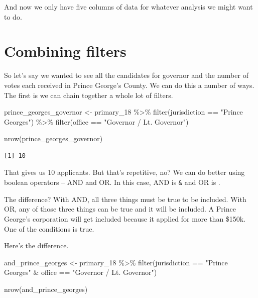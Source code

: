 \documentclass[
  letterpaper,
  DIV=11,
  numbers=noendperiod]{scrreprt}
\newenvironment{Shaded}{\begin{snugshade}}{\end{snugshade}}
\newcommand{\FunctionTok}[1]{\textcolor[rgb]{0.28,0.35,0.67}{#1}}
\newcommand{\NormalTok}[1]{\textcolor[rgb]{0.00,0.23,0.31}{#1}}
\newcommand{\OtherTok}[1]{\textcolor[rgb]{0.00,0.23,0.31}{#1}}
\newcommand{\SpecialCharTok}[1]{\textcolor[rgb]{0.37,0.37,0.37}{#1}}
\newcommand{\StringTok}[1]{\textcolor[rgb]{0.13,0.47,0.30}{#1}}
\begin{document}
And now we only have five columns of data for whatever analysis we might
want to do.

\hypertarget{combining-filters}{%
\section{Combining filters}\label{combining-filters}}

So let's say we wanted to see all the candidates for governor and the
number of votes each received in Prince George's County. We can do this
a number of ways. The first is we can chain together a whole lot of
filters.

\begin{Shaded}
\begin{Highlighting}[]
\NormalTok{prince\_georges\_governor }\OtherTok{\textless{}{-}}\NormalTok{ primary\_18 }\SpecialCharTok{\%\textgreater{}\%} \FunctionTok{filter}\NormalTok{(jurisdiction }\SpecialCharTok{==} \StringTok{"Prince George\textquotesingle{}s"}\NormalTok{) }\SpecialCharTok{\%\textgreater{}\%} \FunctionTok{filter}\NormalTok{(office }\SpecialCharTok{==} \StringTok{"Governor / Lt. Governor"}\NormalTok{)}

\FunctionTok{nrow}\NormalTok{(prince\_georges\_governor)}
\end{Highlighting}
\end{Shaded}

\begin{verbatim}
[1] 10
\end{verbatim}

That gives us 10 applicants. But that's repetitive, no? We can do better
using boolean operators -- AND and OR. In this case, AND is \texttt{\&}
and OR is \texttt{\textbar{}}.

The difference? With AND, all three things must be true to be included.
With OR, any of those three things can be true and it will be included.
A Prince George's corporation will get included because it applied for
more than \$150k. One of the conditions is true.

Here's the difference.

\begin{Shaded}
\begin{Highlighting}[]
\NormalTok{and\_prince\_georges }\OtherTok{\textless{}{-}}\NormalTok{ primary\_18 }\SpecialCharTok{\%\textgreater{}\%} \FunctionTok{filter}\NormalTok{(jurisdiction }\SpecialCharTok{==} \StringTok{"Prince George\textquotesingle{}s"} \SpecialCharTok{\&}\NormalTok{ office }\SpecialCharTok{==} \StringTok{"Governor / Lt. Governor"}\NormalTok{)}

\FunctionTok{nrow}\NormalTok{(and\_prince\_georges)}
\end{Highlighting}
\end{Shaded}
\end{document}
